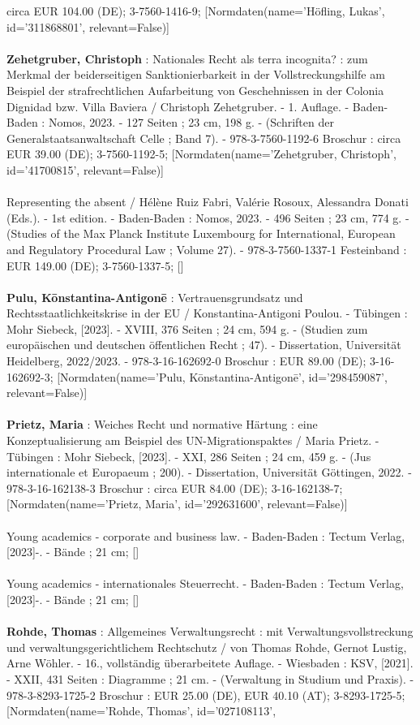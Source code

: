 \documentclass{article}
\begin{document}
\begin{multicols}{3}
circa EUR 104.00 (DE); 3-7560-1416-9; [Normdaten(name='Höfling, Lukas', id='311868801', relevant=False)]\\\\\textbf{Zehetgruber, Christoph} : Nationales Recht als terra incognita? : zum Merkmal der beiderseitigen Sanktionierbarkeit in der Vollstreckungshilfe am Beispiel der strafrechtlichen Aufarbeitung von Geschehnissen in der Colonia Dignidad bzw. Villa Baviera / Christoph Zehetgruber. - 1. Auflage. - Baden-Baden : Nomos, 2023. - 127 Seiten ; 23 cm, 198 g. - (Schriften der Generalstaatsanwaltschaft Celle ; Band 7). - 978-3-7560-1192-6 Broschur : circa EUR 39.00 (DE); 3-7560-1192-5; [Normdaten(name='Zehetgruber, Christoph', id='41700815', relevant=False)]\\\\Representing the absent / Hélène Ruiz Fabri, Valérie Rosoux, Alessandra Donati (Eds.). - 1st edition. - Baden-Baden : Nomos, 2023. - 496 Seiten ; 23 cm, 774 g. - (Studies of the Max Planck Institute Luxembourg for International, European and Regulatory Procedural Law ; Volume 27). - 978-3-7560-1337-1 Festeinband : EUR 149.00 (DE); 3-7560-1337-5; []\\\\\textbf{Pulu, Kōnstantina-Antigonē} : Vertrauensgrundsatz und Rechtsstaatlichkeitskrise in der EU / Konstantina-Antigoni Poulou. - Tübingen : Mohr Siebeck, [2023]. - XVIII, 376 Seiten ; 24 cm, 594 g. - (Studien zum europäischen und deutschen öffentlichen Recht ; 47). - Dissertation, Universität Heidelberg, 2022/2023. - 978-3-16-162692-0 Broschur : EUR 89.00 (DE); 3-16-162692-3; [Normdaten(name='Pulu, Kōnstantina-Antigonē', id='298459087', relevant=False)]\\\\\textbf{Prietz, Maria} : Weiches Recht und normative Härtung : eine Konzeptualisierung am Beispiel des UN-Migrationspaktes / Maria Prietz. - Tübingen : Mohr Siebeck, [2023]. - XXI, 286 Seiten ; 24 cm, 459 g. - (Jus internationale et Europaeum ; 200). - Dissertation, Universität Göttingen, 2022. - 978-3-16-162138-3 Broschur : circa EUR 84.00 (DE); 3-16-162138-7; [Normdaten(name='Prietz, Maria', id='292631600', relevant=False)]\\\\Young academics - corporate and business law. - Baden-Baden : Tectum Verlag, [2023]-. - Bände ; 21 cm; []\\\\Young academics - internationales Steuerrecht. - Baden-Baden : Tectum Verlag, [2023]-. - Bände ; 21 cm; []\\\\\textbf{Rohde, Thomas} : Allgemeines Verwaltungsrecht : mit Verwaltungsvollstreckung und verwaltungsgerichtlichem Rechtschutz / von Thomas Rohde, Gernot Lustig, Arne Wöhler. - 16., vollständig überarbeitete Auflage. - Wiesbaden : KSV, [2021]. - XXII, 431 Seiten : Diagramme ; 21 cm. - (Verwaltung in Studium und Praxis). - 978-3-8293-1725-2 Broschur : EUR 25.00 (DE), EUR 40.10 (AT); 3-8293-1725-5; [Normdaten(name='Rohde, Thomas', id='027108113', 
\end{multicols}
\end{document}
